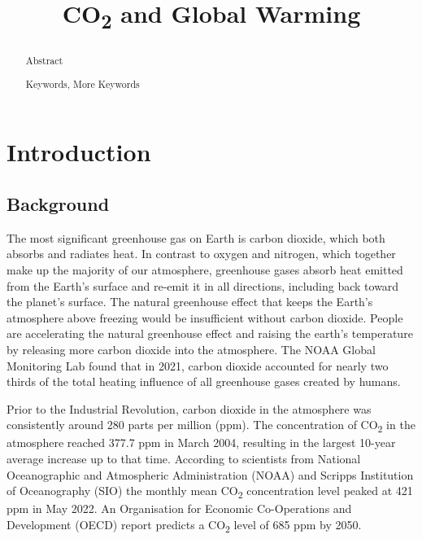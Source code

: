 \documentclass{mcmthesis}
\title{CO\textsubscript{2} and Global Warming}
\begin{document}
\graphicspath{ {./images/} }
    \begin{abstract}
        Abstract

        \begin{keywords}
            Keywords, More Keywords
        \end{keywords}

    \end{abstract}

    \maketitle
    \tableofcontents
    \newpage 


    \section{Introduction}

    \subsection{Background}
    The most significant greenhouse gas on Earth is carbon dioxide, which both absorbs and radiates heat. In contrast to oxygen and nitrogen, which together make up the majority of our atmosphere, greenhouse gases absorb heat emitted from the Earth's surface and re-emit it in all directions, including back toward the planet's surface. The natural greenhouse effect that keeps the Earth's atmosphere above freezing would be insufficient without carbon dioxide. People are accelerating the natural greenhouse effect and raising the earth's temperature by releasing more carbon dioxide into the atmosphere. The NOAA Global Monitoring Lab found that in 2021, carbon dioxide accounted for nearly two thirds of the total heating influence of all greenhouse gases created by humans.

    Prior to the Industrial Revolution, carbon dioxide in the atmosphere was consistently around 280 parts per million (ppm).
    The concentration of CO\textsubscript{2} in the atmosphere reached 377.7 ppm
    in March 2004, resulting in the largest 10-year average
    increase up to that time. According to scientists from National
    Oceanographic and Atmospheric Administration (NOAA) and
    Scripps Institution of Oceanography (SIO) the monthly mean
    CO\textsubscript{2} concentration level peaked at 421 ppm in May 2022. An
    Organisation for Economic Co-Operations and Development
    (OECD) report predicts a CO\textsubscript{2} level of 685 ppm by 2050.
\end{document}
